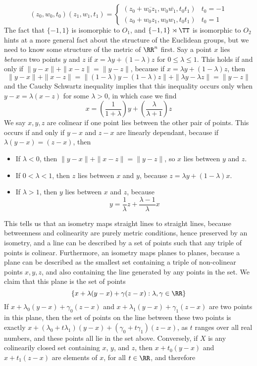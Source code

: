 %
\[ (z_0,w_0,t_0)(z_1,w_1,t_1) = \begin{cases} (z_0 + \overline{w_0z_1},w_0\overline{w_1},t_0t_1) & t_0 = -1 \\ (z_0 + w_0z_1,w_0w_1, t_0t_1) & t_0 = 1 \end{cases} \]
%
The fact that $\{ -1, 1 \}$ is isomorphic to $O_1$, and $\{ -1, 1 \} \rtimes \TT$ is isomorphic to $O_2$ hints at a more general fact about the structure of the Euclidean groups, but we need to know some structure of the metric of $\RR^n$ first. Say a point $x$ lies {\it between} two points $y$ and $z$ if $x = \lambda y + (1 - \lambda)z$ for $0 \leq \lambda \leq 1$. This holds if and only if $\| y - x \| + \| x - z \| = \| y - z \|$, because if $x = \lambda y + (1 - \lambda) z$, then
%
\[ \| y - x \| + \| x - z \| = \|(1 - \lambda)y - (1 - \lambda)z \| + \| \lambda y - \lambda z \| = \| y - z \| \]
%
and the Cauchy Schwartz inequality implies that this inequality occurs only when $y - x = \lambda (x - z)$ for some $\lambda > 0$, in which case we find
%
\[ x = \left( \frac{1}{1 + \lambda} \right) y + \left( \frac{\lambda}{\lambda + 1} \right) z \]
%
We say $x,y,z$ are colinear if one point lies between the other pair of points. This occurs if and only if $y - x$ and $z - x$ are linearly dependant, because if $\lambda (y - x) = (z - x)$, then
%
\begin{itemize}
    \item If $\lambda < 0$, then $\| y - x \| + \| x - z \| = \| y - z \|$, so $x$ lies between $y$ and $z$.
    \item If $0 < \lambda < 1$, then $z$ lies between $x$ and $y$, because $z = \lambda y + (1 - \lambda) x$.
    \item If $\lambda > 1$, then $y$ lies between $x$ and $z$, because
    \[ y = \frac{1}{\lambda} z + \frac{\lambda - 1}{\lambda} x \]
\end{itemize}
%
This tells us that an isometry maps straight lines to straight lines, because betweenness and colinearity are purely metric conditions, hence preserved by an isometry, and a line can be described by a set of points such that any triple of points is colinear. Furthermore, an isometry maps planes to planes, because a plane can be described as the smallest set containing a triple of non-colinear points $x,y,z$, and also containing the line generated by any points in the set. We claim that this plane is the set of points
%
\[ \{ x + \lambda (y - x) + \gamma (z - x) : \lambda, \gamma \in \RR \} \]
%
If $x + \lambda_0 (y - x) + \gamma_0 (z - x)$ and $x + \lambda_1 (y - x) + \gamma_1 (z - x)$ are two points in this plane, then the set of points on the line between these two points is exactly $x + (\lambda_0 + t \lambda_1) (y - x) + (\gamma_0 + t \gamma_1) (z - x)$, as $t$ ranges over all real numbers, and these points all lie in the set above. Conversely, if $X$ is any colinearily closed set containing $x$, $y$, and $z$, then $x + t_0 (y - x)$ and $x + t_1 (z - x)$ are elements of $x$, for all $t \in \RR$, and therefore

